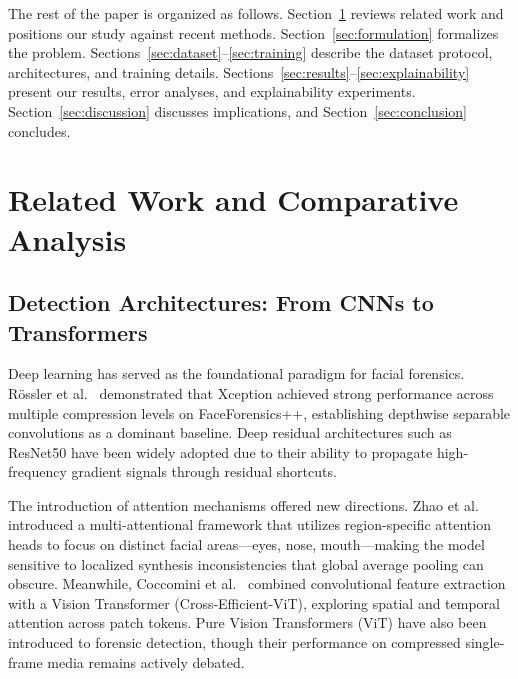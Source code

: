 \documentclass[conference]{IEEEtran}
\begin{document}
The rest of the paper is organized as follows. Section~\ref{sec:related_work} reviews related work and positions our study against recent methods. Section~\ref{sec:formulation} formalizes the problem. Sections~\ref{sec:dataset}--\ref{sec:training} describe the dataset protocol, architectures, and training details. Sections~\ref{sec:results}--\ref{sec:explainability} present our results, error analyses, and explainability experiments. Section~\ref{sec:discussion} discusses implications, and Section~\ref{sec:conclusion} concludes.


\section{Related Work and Comparative Analysis}
\label{sec:related_work}

\subsection{Detection Architectures: From CNNs to Transformers}

Deep learning has served as the foundational paradigm for facial forensics. R{\"o}ssler et al.\ \cite{rossler2019faceforensics} demonstrated that Xception \cite{chollet2017xception} achieved strong performance across multiple compression levels on FaceForensics++, establishing depthwise separable convolutions as a dominant baseline. Deep residual architectures such as ResNet50 \cite{he2016resnet} have been widely adopted due to their ability to propagate high-frequency gradient signals through residual shortcuts.

The introduction of attention mechanisms offered new directions. Zhao et al.\ \cite{zhao2021multiattentional} introduced a multi-attentional framework that utilizes region-specific attention heads to focus on distinct facial areas---eyes, nose, mouth---making the model sensitive to localized synthesis inconsistencies that global average pooling can obscure. Meanwhile, Coccomini et al.\ \cite{coccomini2022crossefficientvit} combined convolutional feature extraction with a Vision Transformer (Cross-Efficient-ViT), exploring spatial and temporal attention across patch tokens. Pure Vision Transformers (ViT) \cite{dosovitskiy2020vit} have also been introduced to forensic detection, though their performance on compressed single-frame media remains actively debated.
\end{document}
